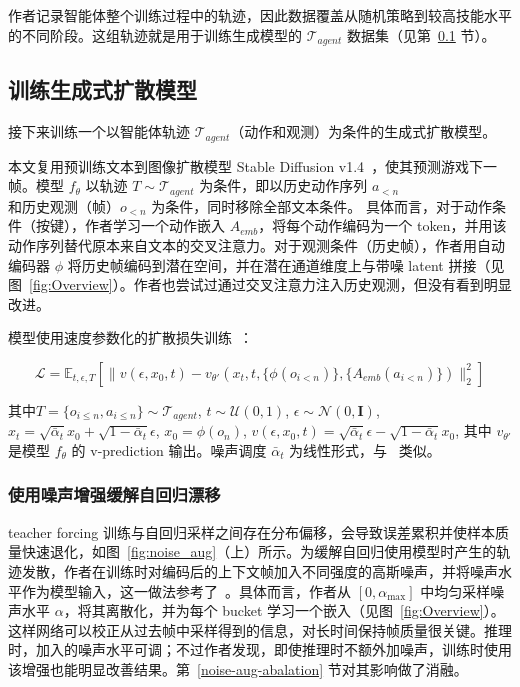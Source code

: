\documentclass{article} %
\begin{document}
作者记录智能体整个训练过程中的轨迹，因此数据覆盖从随机策略到较高技能水平的不同阶段。这组轨迹就是用于训练生成模型的 $\mathcal{T}_{agent}$ 数据集（见第~\ref{training-diffusion-model} 节）。

\subsection{训练生成式扩散模型}
\label{training-diffusion-model}

接下来训练一个以智能体轨迹 $\mathcal{T}_{agent}$（动作和观测）为条件的生成式扩散模型。

本文复用预训练文本到图像扩散模型 Stable Diffusion v1.4~\citep{rombach2022high}，使其预测游戏下一帧。模型 $f_{\theta}$ 以轨迹 $T \sim \mathcal{T}_{agent}$ 为条件，即以历史动作序列 $a_{<n}$ 和历史观测（帧）$o_{<n}$ 为条件，同时移除全部文本条件。
具体而言，对于动作条件（按键），作者学习一个动作嵌入 $A_{emb}$，将每个动作编码为一个 token，并用该动作序列替代原本来自文本的交叉注意力。对于观测条件（历史帧），作者用自动编码器 $\phi$ 将历史帧编码到潜在空间，并在潜在通道维度上与带噪 latent 拼接（见图~\ref{fig:Overview}）。作者也尝试过通过交叉注意力注入历史观测，但没有看到明显改进。

模型使用速度参数化的扩散损失训练~\citep{salimans2022progressivedistillationfastsampling}：

\begin{equation}
    \mathcal{L} = \mathbb{E}_{t,\epsilon,T} \left[ \| v(\epsilon, x_0, t) - v_{\theta'}(x_t, t, \{\phi(o_{i < n})\}, \{A_{emb}(a_{i < n})\}) \|_2^2 \right]
\end{equation}

其中$T = \{{o_{i \leq n}, a_{i \leq n}}\} \sim \mathcal{T}_{agent}$, $t \sim \mathcal{U}(0, 1)$, $\epsilon \sim \mathcal{N}(0, \mathbf{I})$, \mbox{$x_t = \sqrt{\bar{\alpha}_t} x_0 + \sqrt{1 - \bar{\alpha}_t} \epsilon$}, \mbox{$x_0 = \phi(o_n)$},
$v(\epsilon, x_0, t) = \sqrt{\bar{\alpha}_t} \epsilon - \sqrt{1 - \bar{\alpha}_t} x_0$,
其中 $v_{\theta'}$ 是模型 $f_{\theta}$ 的 v-prediction 输出。噪声调度 $\bar{\alpha}_t$ 为线性形式，与~\cite{rombach2022high} 类似。

\subsubsection{使用噪声增强缓解自回归漂移}
\label{sec:mitigating ar noise}

teacher forcing 训练与自回归采样之间存在分布偏移，会导致误差累积并使样本质量快速退化，如图~\ref{fig:noise_aug}（上）所示。为缓解自回归使用模型时产生的轨迹发散，作者在训练时对编码后的上下文帧加入不同强度的高斯噪声，并将噪声水平作为模型输入，这一做法参考了~\cite{ho2021cascaded}。具体而言，作者从 $[0, \alpha_{\max}]$ 中均匀采样噪声水平 $\alpha$，将其离散化，并为每个 bucket 学习一个嵌入（见图~\ref{fig:Overview}）。这样网络可以校正从过去帧中采样得到的信息，对长时间保持帧质量很关键。推理时，加入的噪声水平可调；不过作者发现，即使推理时不额外加噪声，训练时使用该增强也能明显改善结果。第~\ref{noise-aug-abalation} 节对其影响做了消融。
\end{document}
